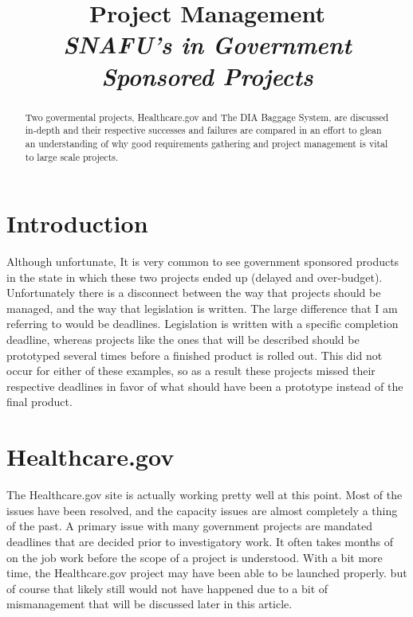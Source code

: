 \documentclass[conference]{IEEEtran}
\title{Project Management\\\em\large{SNAFU's in Government Sponsored Projects}}
\author{\IEEEauthorblockN{Daniel Fallon, Student}
	\IEEEauthorblockA{Department of Computer Science,\\ College of Science, \\Illinois Institute of Technology, \\Chicago IL 60616}}
\begin{document}
\maketitle

\begin{abstract}
Two govermental projects, Healthcare.gov and The DIA Baggage System, are discussed in-depth and their respective successes and failures are compared in an effort to glean an understanding of why good requirements gathering and project management is vital to large scale projects.
\end{abstract}

\section{Introduction}
	Although unfortunate, It is very common to see government sponsored products in the state in which these two projects ended up (delayed and over-budget). Unfortunately there is a disconnect between the way that projects should be managed, and the way that legislation is written. The large difference that I am referring to would be deadlines. Legislation is written with a specific completion deadline, whereas projects like the ones that will be described should be prototyped several times before a finished product is rolled out. This did not occur for either of these examples, so as a result these projects missed their respective deadlines in favor of what should have been a prototype instead of the final product.  
\section{Healthcare.gov}
	The Healthcare.gov site is actually working pretty well at this point. Most of the issues have been resolved, and the capacity issues are almost completely a thing of the past. A primary issue with many government projects are mandated deadlines that are decided prior to investigatory work. It often takes months of on the job work before the scope of a project is understood. With a bit more time, the Healthcare.gov project may have been able to be launched properly. but of course that likely still would not have happened due to a bit of mismanagement that will be discussed later in this article.
\end{document}
